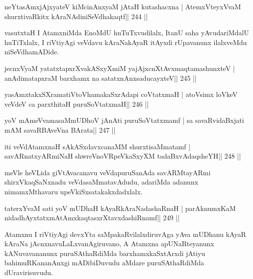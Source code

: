 \begin{shl}
neYtasAmxjAjxyateV kiMcinAnxyaM jAtaH kutashacxna |
AtemxVteyxVvaM shurxtivaRkitx kAraNAdiniSeVdhakaqtf\hfill || 244 ||
\end{shl}

\begin{artha}
vasutxtaH I AtamxniMda EnoMdU huTuTxvudilalx, ItanU saha yAvuda\-riMdalU huTiTxlalx, I riVtiyAgi veVdavu kAraNakAyaR itAyxdi rUpavanunx ilalxveMdu niSeVdhamADide.
\end{artha}


\begin{shl}
jecnxVyaM yatatxtapxrXvakASxyXmiM yajAjxcnXtAvx\s maqtamashunxteV |
anAdimatapxraM barxhamx na satatxnAnxsaducayxteV\hfill || 245 ||
\end{shl}

\begin{shl}
yasAmxtakxSXramatiVtoV\s hamakaSxrAdapi coVtatxmaH |
atoV\s simx loVkeV veVdeV ca parxthitaH puruSoVtatxmaH\hfill || 246 ||
\end{shl}

\begin{shl}
yoV mAmeVvamasaMmUDhoV jAnAti puruSoVtatxmamf |
sa savaRvidaBxjati mAM savaRBAveVna BArata\hfill || 247 ||
\end{shl}

\begin{shl}
iti veVdAtamxnaH sAkASxdavxcanaMM shurxtisaMmatamf |
savARnatxyARmiNaH shwreVnoVRpeVkaSxyXM tadaBxvAdaqsheYH\hfill || 248 ||
\end{shl}

\begin{artha}
meVle heVLida giVtAvacanavu veVdapuruSanAda savARMtayARmi shirxVkaqSaNx\-nadu veVdasaMmatavAdudu, adariMda adanunx nimamxMthavaru upeVkiSxsatakakxdadxlalx.
\end{artha}


\begin{shl}
taterxYvaM sati yoV mUDhaH kAyaRkAraNadashaRnaH |
parAknumxKaM nidadhAyxtatxmAtAmxkaqtasxrXtavxdashiRnamf\hfill || 249 ||
\end{shl}

\begin{artha}
Atamxnu I riVtiyAgi devxYta saMpakaRvilalxdiruvAga yAva mUDhanu kAyaR kAraNa jAcnxnavuLaLxvanAgiruvano, A Atamxna apUNaRteyanunx kANuvavananunx puruSAthaRdiMda barxhamxkaSxtArxdi jAtiyu bahimuRKananAnxgi mADibiDuvudu aMdare puruSAthaRdiMda dUravirisuvudu.
\end{artha}


